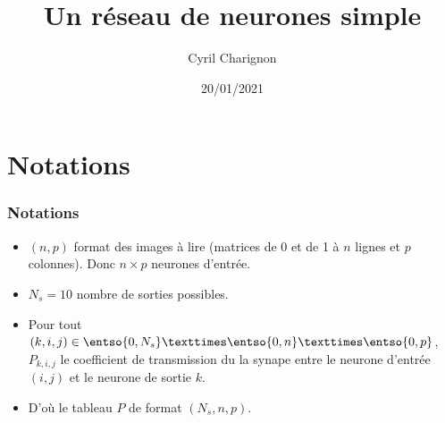 \documentclass{présentation}
\begin{document}
\title{Un réseau de neurones simple}
\author{Cyril Charignon}
\date{20/01/2021}
\maketitle{}



\modePython

\begin{frame}
  \tableofcontents
\end{frame}

\section{Notations}


\begin{frame}
  \frametitle{Notations}

  \pause

  \begin{itemize}[<+->]
  \item $(n,p)$ format des images à lire (matrices de 0 et de 1 à $n$ lignes et $p$ colonnes). Donc $n×p$ neurones d'entrée.
    
  \item $N_s=10$ nombre de sorties possibles.
  \item Pour tout $(k,i,j)\in\entso{0,N_s}×\entso{0,n}×\entso{0,p}$, $P_{k,i,j}$ le coefficient de transmission du la synape entre le neurone d'entrée $(i,j)$ et le neurone de sortie $k$.
  \item D'où le tableau $P$ de format $(N_s,n,p)$.
  \end{itemize}
\end{frame}
\end{document}
